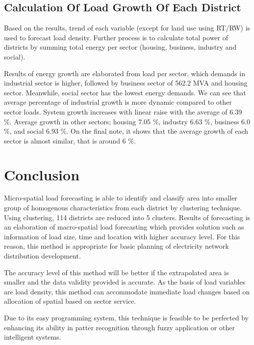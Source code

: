 \documentclass[conference]{IEEEtran}
\begin{document}
{\subsection{Calculation Of Load Growth Of Each District}
Based on the results, trend of each variable (except for land use using RT/RW) is used to forecast load density. Further process is to calculate total power of districts by summing total energy per sector (housing, business, industry and social). 
    
    
Results of energy growth are elaborated from load per sector, which demands in industrial sector is higher, followed by business sector of 562.2 MVA and housing sector. Meanwhile, social sector has the lowest energy demands.
We can see that average percentage of industrial growth is more dynamic compared to other sector loads. System growth increases with linear raise with the average of 6.39 \%. Average growth in other sectors; housing 7.05 \%, industry 6.63 \%, business 6.0 \%, and social 6.93 \%. On the final note, it shows that the average growth of each sector is almost similar, that is around 6 \%.

\section{Conclusion}
Micro-spatial load forecasting is able to identify and classify area into smaller group of homogenous characteristics from each district by clustering technique. Using clustering, 114 districts are reduced into 5 clusters. Results of forecasting is an elaboration of macro-spatial load forecasting which provides solution such as information of load size, time and location with higher accuracy level. For this reason, this method is appropriate for basic planning of electricity network distribution development.

The accuracy level of this method will be better if the extrapolated area is smaller and the data validity provided is accurate. As the basis of load variables are load density, this method can accommodate immediate load changes based on allocation of spatial based on sector service.

Due to its easy programming system, this technique is feasible to be perfected by enhancing its ability in patter recognition through fuzzy application or other intelligent systems.

}
\end{document}
